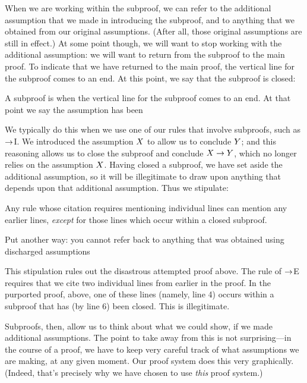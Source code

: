 When we are working within the subproof, we can refer to the additional assumption that we made in introducing the subproof, and to anything that we obtained from our original assumptions. (After all, those original assumptions are still in effect.) At some point though, we will want to stop working with the additional assumption: we will want to return from the subproof to the main proof. To indicate that we have returned to the main proof, the vertical line for the subproof comes to an end. At this point, we say that the subproof is {closed}:
\begin{highlighted}A subproof is  when the vertical line for the subproof comes to an end. At that point we say the assumption has been \end{highlighted} We typically do this when we use one of our rules that involve subproofs, such as $\rightarrow$I. We introduced the assumption $X$ to allow us to conclude $Y$; and this reasoning allows us to close the subproof and conclude $X\rightarrow Y$, which no longer relies on the assumption $X$.
Having closed a subproof, we have set aside the additional assumption, so it will be illegitimate to draw upon anything that depends upon that additional assumption. Thus we stipulate:
\begin{highlighted}Any rule whose citation requires mentioning individual lines can mention any earlier lines, \emph{except} for those lines which occur within a closed subproof.
	
	Put another way: you cannot refer back to anything that was obtained using discharged assumptions\end{highlighted}
This stipulation rules out the disastrous attempted proof above. The rule of $\rightarrow$E requires that we cite two individual lines from earlier in the proof. In the purported proof, above, one of these lines (namely, line 4) occurs within a subproof that has (by line 6) been closed. This is illegitimate.

Subproofs, then, allow us to think about what we could show, if we made additional assumptions. The point to take away from this is not surprising---in the course of a proof, we have to keep very careful track of what assumptions we are making, at any given moment. Our proof system does this very graphically. (Indeed, that's precisely why we have chosen to use \emph{this} proof system.)

